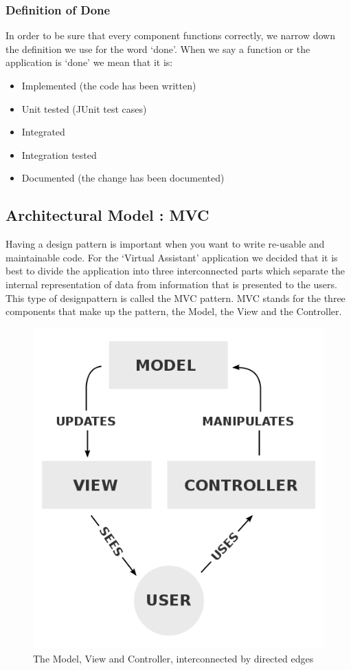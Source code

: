 \subsubsection{Definition of Done} 
In order to be sure that every component functions correctly, we narrow down the definition we use for the word `done'. When we say a function or the application is `done' we mean that it is: 

\begin{itemize}
	\item	Implemented (the code has been written)
	\item	Unit tested (JUnit test cases)
	\item 	Integrated
	\item 	Integration tested
	\item 	Documented (the change has been documented)
\end{itemize} 

\subsection{Architectural Model : MVC}
Having a design pattern is important when you want to write re-usable and maintainable code.
For the `Virtual Assistant' application we decided that it is best to divide the application into three interconnected parts which separate the internal representation of data from information that is presented to the users\cite{wiki:mvc}. This type of designpattern is called the MVC pattern. MVC stands for the three components that make up the pattern, the Model, the View and the Controller.
\begin{figure}[h]
\centering
\includegraphics[scale=0.3]{./img/MVC.png}
\caption{\small{The Model, View and Controller, interconnected by directed edges}}
\label{mvc}
	
\end{figure}

